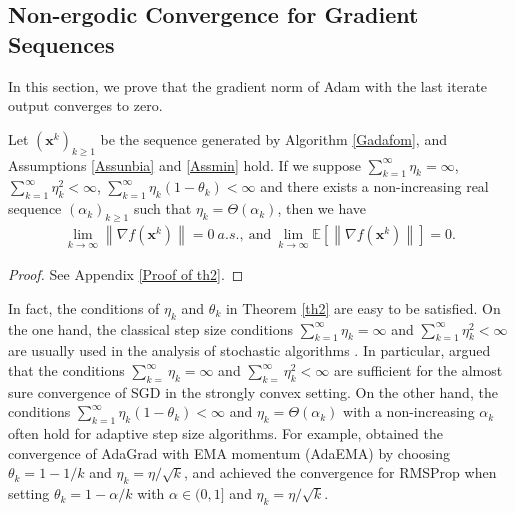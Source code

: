 \documentclass[twoside,11pt]{article}
\begin{document}
\subsection{Non-ergodic Convergence for Gradient Sequences}\label{Non-ergodic Convergence for Gradient Sequence}	
In this section, we prove that the gradient norm of Adam with the last iterate output converges to zero.
\begin{theorem}\label{th2}
Let $(\mathbf{x}^k)_{k\ge 1}$ be the sequence generated by Algorithm \ref{Gadafom}, and Assumptions \ref{Assunbia} and \ref{Assmin} hold.  If we suppose   $\sum_{k=1}^{\infty}\eta_{k}=\infty$, $ \sum_{k=1}^{\infty}\eta_{k}^2<\infty$, $ \sum_{k=1}^{\infty}\eta_{k}(1-\theta_k)<\infty$ and there exists a non-increasing real sequence $(\alpha_k)_{k\ge 1}$ such that  $\eta_k=\Theta(\alpha_{k})$, then we have
\begin{equation}\label{th2.1}
	\begin{aligned}
		\lim_{k\rightarrow\infty} \left\| \nabla f(\mathbf{x}^k)\right\|=0\ a.s.,\ 
		\text{and}\ \lim_{k\rightarrow\infty} \mathbb{E}\left[\left\| \nabla f(\mathbf{x}^k)\right\|\right]=0.\nonumber
	\end{aligned}
\end{equation}
\end{theorem}
\begin{proof}
See Appendix \ref{Proof of th2}.
\end{proof}
\par In fact, the conditions of $\eta_{k}$ and $\theta_k$ in Theorem \ref{th2} are easy to be satisfied. On the one hand, the classical step size conditions  $\sum_{k=1}^{\infty}\eta_{k}=\infty$ and $\sum_{k=1}^{\infty}\eta_{k}^2<\infty$  are usually used in the analysis of stochastic algorithms  \citep[e.g.,][]{bertsekas2000gradient,bottou2018optimization,LIU202327}. In particular, \citet{new} argued that the conditions $\sum_{k=}^{\infty}\eta_{k}=\infty$ and $\sum_{k=}^{\infty}\eta_{k}^{2}<\infty$ are sufficient for the almost sure convergence of SGD in the strongly convex setting. On the other hand, the conditions  $\sum_{k=1}^{\infty}\eta_{k}(1-\theta_k)<\infty$ and $\eta_k=\Theta(\alpha_{k})$ with a non-increasing $\alpha_{k}$ often hold for adaptive step size algorithms. For example, \citet{chen2019convergence} obtained the convergence of AdaGrad with EMA momentum (AdaEMA) by choosing $\theta_k=1-1/k$ and $\eta_{k}=\eta/\sqrt{k}$, and \citet{mukkamala2017variants} achieved the convergence for RMSProp when setting $\theta_k=1-\alpha/k$ with $\alpha\in(0,1]$ and $\eta_{k}=\eta/\sqrt{k}$.
\end{document}
